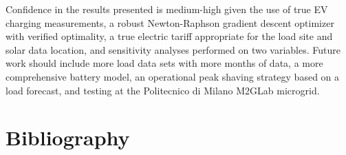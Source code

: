 \documentclass[journal,article,submit,pdftex,moreauthors]{Definitions/mdpi}
\begin{document}
Confidence in the results presented is medium-high given the use of true EV charging measurements, a robust Newton-Raphson gradient descent optimizer with verified optimality, a true electric tariff appropriate for the load site and solar data location, and sensitivity analyses performed on two variables. Future work should include more load data sets with more months of data, a more comprehensive battery model, an operational peak shaving strategy based on a load forecast, and testing at the Politecnico di Milano M2GLab microgrid.

\section{Bibliography}\label{bibliography}%


\end{document}
